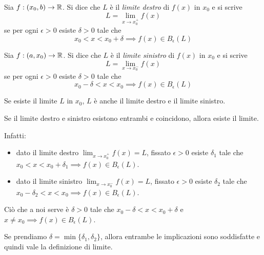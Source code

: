 \begin{definition}
Sia $f: (x_0, b) \to \mathbb R$. Si dice che $L$ è il \emph{limite destro} di $f(x)$ in $x_0$ e si scrive
\begin{equation*}
L = \lim_{x \to x_0^+} f(x)
\end{equation*}
se per ogni $\epsilon > 0$ esiste $\delta > 0$ tale che
\begin{equation*}
x_0 < x < x_0 + \delta \implies f(x) \in B_\epsilon (L)
\end{equation*}
\end{definition}

\begin{definition}
Sia $f: (a, x_0) \to \mathbb R$. Si dice che $L$ è il \emph{limite sinistro} di $f(x)$ in $x_0$ e si scrive
\begin{equation*}
L = \lim_{x \to x_0^-} f(x)
\end{equation*}
se per ogni $\epsilon > 0$ esiste $\delta > 0$ tale che
\begin{equation*}
x_0 - \delta < x < x_0 \implies f(x) \in B_\epsilon (L)
\end{equation*}
\end{definition}

\begin{remark}
Se esiste il limite $L$ in $x_0$, $L$ è anche il limite destro e il limite sinistro.
\end{remark}
\begin{remark}
Se il limite destro e sinistro esistono entrambi e coincidono, allora esiste il limite.
\end{remark}

Infatti:
\begin{itemize}
\item dato il limite destro $\lim_{x \to x_0^+} f(x) = L$, fissato $\epsilon > 0$ esiste $\delta_1$ tale che $x_0 < x < x_0 + \delta_1 \implies f(x) \in B_\epsilon (L)$.
\item dato il limite sinistro $\lim_{x \to x_0^-} f(x) = L$, fissato $\epsilon > 0$ esiste $\delta_2$ tale che $x_0 - \delta_2 < x < x_0 \implies f(x) \in B_\epsilon (L)$.
\end{itemize}

Ciò che a noi serve è $\delta > 0$ tale che $x_0 - \delta < x < x_0 + \delta$ e $x \neq x_0 \implies f(x) \in B_\epsilon (L)$.

Se prendiamo $\delta = \min\{\delta_1, \delta_2\}$, allora entrambe le implicazioni sono soddisfatte e quindi vale la definizione di limite.

